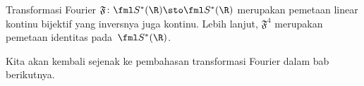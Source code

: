 \begin{prop} Transformasi Fourier $\mathfrak F\colon \fml S^*(\R) \sto \fml S^*(\R)$ merupakan pemetaan linear kontinu
bijektif yang inversnya juga kontinu. Lebih lanjut, $\mathfrak F^4$ merupakan pemetaan identitas pada~$\fml S^*(\R)$.
\end{prop}

Kita akan kembali sejenak ke pembahasan transformasi Fourier dalam bab berikutnya.
















\endinput
